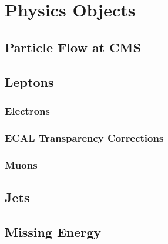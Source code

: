 \chapter{Physics Objects}
\section{Particle Flow at \ac{CMS}}
\section{Leptons}
\subsection{Electrons}
\subsection{\ac{ECAL} Transparency Corrections}
\label{sec:reco_ecal_transparency}
\subsection{Muons}
\section{Jets}
\section{Missing Energy}

